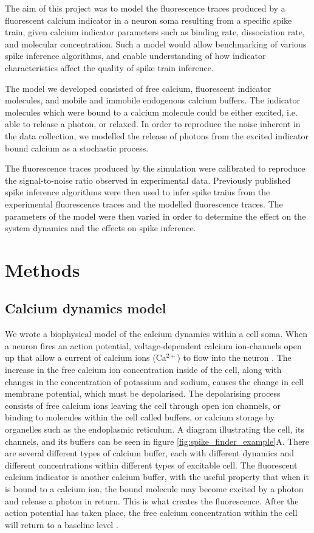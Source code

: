The aim of this project was to model the fluorescence traces produced by a fluorescent calcium indicator in a neuron soma resulting from a specific spike train, given calcium indicator parameters such as binding rate, dissociation rate, and molecular concentration. Such a model would allow benchmarking of various spike inference algorithms, and enable understanding of how indicator characteristics affect the quality of spike train inference.

The model we developed consisted of free calcium, fluorescent indicator molecules, and mobile and immobile endogenous calcium buffers. The indicator molecules which were bound to a calcium molecule could be either excited, i.e. able to release a photon, or relaxed. In order to reproduce the noise inherent in the data collection, we modelled the release of photons from the excited indicator bound calcium as a stochastic process.

The fluorescence traces produced by the simulation were calibrated to reproduce the signal-to-noise ratio observed in experimental data. Previously published spike inference algorithms were then used to infer spike trains from the experimental fluorescence traces and the modelled fluorescence traces. The parameters of the model were then varied in order to determine the effect on the system dynamics and the effects on spike inference.

\section{Methods}
\subsection{Calcium dynamics model}
We wrote a biophysical model of the calcium dynamics within a cell soma. When a neuron fires an action potential, voltage-dependent calcium ion-channels open up that allow a current of calcium ions (Ca$^{2+}$) to flow into the neuron  \parencite{koch}. The increase in the free calcium ion concentration inside of the cell, along with changes in the concentration of potassium and sodium, causes the change in cell membrane potential, which must be depolarised. The depolarising process consists of free calcium ions leaving the cell through open ion channels, or binding to molecules within the cell called buffers, or calcium storage by organelles such as the endoplasmic reticulum. A diagram illustrating the cell, its channels, and its buffers can be seen in figure \ref{fig:spike_finder_example}A. There are several different types of calcium buffer, each with different dynamics and different concentrations within different types of excitable cell. The fluorescent calcium indicator is another calcium buffer, with the useful property that when it is bound to a calcium ion, the bound molecule may become excited by a photon and release a photon in return. This is what creates the fluorescence. After the action potential has taken place, the free calcium concentration within the cell will return to a baseline level  \parencite{maravall}.

